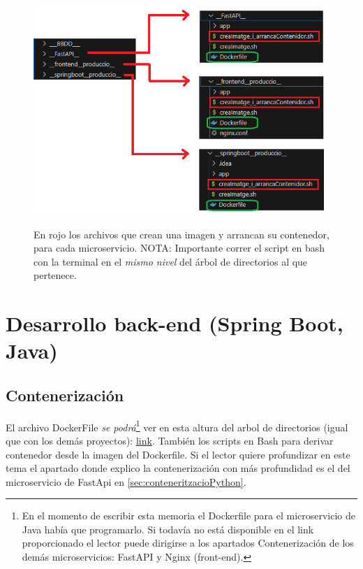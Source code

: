 \documentclass[a4paper,12pt]{report}
\begin{document}
				
				\FloatBarrier
				\setlength{\belowcaptionskip}{3pt}
				\begin{figure}[H]
					\centering
					\caption{En rojo los archivos que crean una imagen y arrancan su contenedor, para cada microservicio. NOTA: Importante correr el script en bash con la terminal en el \textit{mismo nivel} del árbol de directorios al que pertenece.}
					\includegraphics[width=.7\linewidth]{img/dockeritzacioAplicacioPlantilla.png}
					\label{fig:dockeritzacioAplicacioPlantilla}
				\end{figure}
				\FloatBarrier
				
			

			
			\section{Desarrollo back-end (Spring Boot, Java)}
			\label{sec:parteSpringBoot}
			
				\subsection{Contenerización}
				
				El archivo DockerFile  \textit{se podrá}\footnote{En el momento de escribir esta memoria el Dockerfile para el microservicio de Java había que programarlo. Si todavía no está disponible en el link proporcionado el lector puede dirigirse a los apartados Contenerización de los demás microservicios: FastAPI y Nginx (front-end).} ver en esta altura del arbol de directorios (igual que con los demás proyectos): \href{https://github.com/blackcub3s/mercApp/tree/main/APP%20WEB/__springboot__produccio__}{link}. También los scripts en Bash para derivar contenedor desde la imagen del Dockerfile. Si el lector quiere profundizar en este tema el apartado donde explico la contenerización con más profundidad es el del microservicio de FastApi en \ref{sec:conteneritzacioPython}.
			
\end{document}
